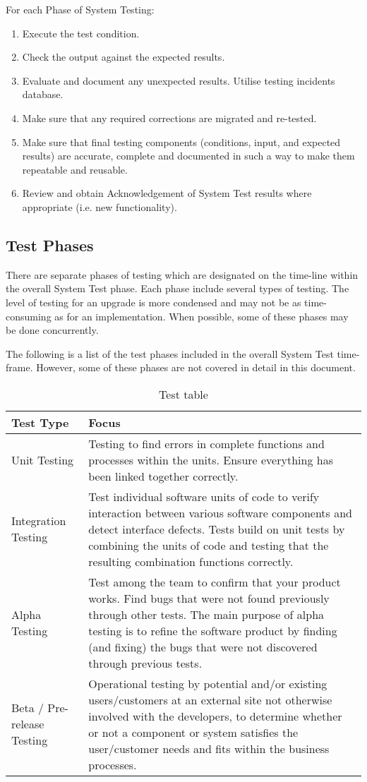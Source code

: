 \documentclass{unitemplate}
\begin{document}
For each Phase of System Testing:
\begin{enumerate}
	\item Execute the test condition.
	\item Check the output against the expected results.
	\item Evaluate and document any unexpected results.  Utilise testing incidents database.
	\item Make sure that any required corrections are migrated and re-tested.
	\item Make sure that final testing components (conditions, input, and expected results) are accurate, complete and documented in such a way to make them repeatable and reusable.  
	\item Review and obtain Acknowledgement of System Test results where appropriate (i.e. new functionality).
\end{enumerate}

\subsection{Test Phases}
There are separate phases of testing which are designated on the time-line within the overall System Test phase.  Each phase include several types of testing.  The level of testing for an upgrade is more condensed and may not be as time-consuming as for an implementation.  When possible, some of these phases may be done concurrently.  

The following is a list of the test phases included in the overall System Test time-frame.  However, some of these phases are not covered in detail in this document.


\begin{table}[h]
	\begin{tabulary}{1\textwidth}{LL}
	\hline
		\textbf{Test Type} & \textbf{Focus} \\\hline
		Unit Testing & Testing to find errors in complete functions and processes within the units.  Ensure everything has been linked together correctly. \\\hline
		Integration Testing & Test individual software units of code to verify interaction between various software components and detect interface defects. Tests build on unit tests by combining the units of code and testing that the resulting combination functions correctly. \\\hline
		Alpha Testing & Test among the team to confirm that your product works. Find bugs that were not found previously through other tests. The main purpose of alpha testing is to refine the software product by finding (and fixing) the bugs that were not discovered through previous tests. \\\hline
		Beta / Pre-release Testing & Operational testing by potential and/or existing users/customers at an external site not otherwise involved with the developers, to determine whether or not a component or system satisfies the user/customer needs and fits within the business processes. \\\hline
    \end{tabulary}
	\caption{Test table}
	\label{tab:test}
\end{table}
\end{document}
